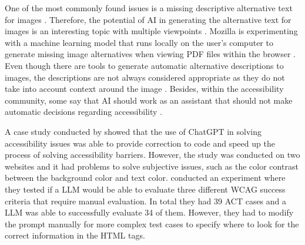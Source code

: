 One of the most commonly found issues is a missing descriptive alternative text for images \citep{webaimmillions, dequecoverage}. Therefore, the potential of AI in generating the alternative text for images is an interesting topic with multiple viewpoints \citep{ai_wcag_email, boia_alt_text, potential_for_ai}. Mozilla is experimenting with a machine learning model that runs locally on the user's computer to generate missing image alternatives when viewing PDF files within the browser \citep{alt_image_mozilla}. Even though there are tools to generate automatic alternative descriptions to images, the descriptions are not always considered appropriate as they do not take into account context around the image \citep{accessibility_and_ai, boia_alt_text}. Besides, within the accessibility community, some say that AI should work as an assistant that should not make automatic decisions regarding accessibility \citep{ai_wcag_email, accessibility_and_ai}.

A case study conducted by \textcite{10.1145/3594806.3596542_case_study_gpt} showed that the use of ChatGPT in solving accessibility issues was able to provide correction to code and speed up the process of solving accessibility barriers. However, the study was conducted on two websites and it had problems to solve subjective issues, such as the color contrast between the background color and text color. \textcite{Lopez2024Turning} conducted an experiment where they tested if a LLM would be able to evaluate three different WCAG success criteria that require manual evaluation. In total they had 39 ACT cases and a LLM was able to successfully evaluate 34 of them. However, they had to modify the prompt manually for more complex test cases to specify where to look for the correct information in the HTML tags.

